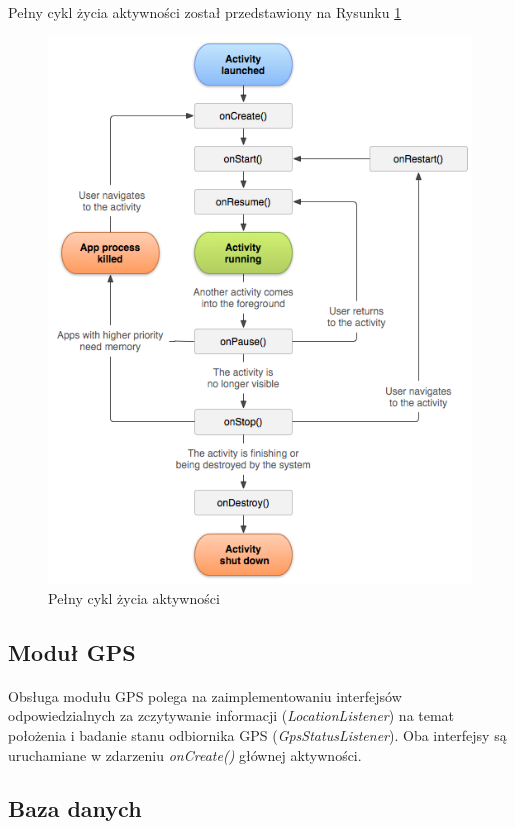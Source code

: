 \paragraph{} 
Pełny cykl życia aktywności został przedstawiony na Rysunku \ref{fig:activity_lifecycle}

\begin{figure}[ht]
	\centering
		\includegraphics[width=0.7\linewidth]{assets/activity_lifecycle.png}
		\caption{Pełny cykl życia aktywności}
	\label{fig:activity_lifecycle}
\end{figure}

\subsection{Moduł GPS} %
\label{sub:modu_gps}

\paragraph{} %
\label{par:}
Obsługa modułu GPS polega na zaimplementowaniu interfejsów odpowiedzialnych za zczytywanie informacji (\textit{LocationListener}) na temat położenia i badanie stanu odbiornika GPS (\textit{GpsStatusListener}). Oba interfejsy są uruchamiane w zdarzeniu \textit{onCreate()} głównej aktywności.
 
\newpage
\subsection{Baza danych} %
\label{sub:baza_danych}
